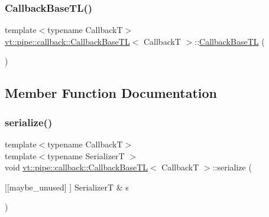 \subsubsection{\texorpdfstring{Callback\+Base\+T\+L()}{CallbackBaseTL()}}
{\footnotesize\ttfamily template$<$typename CallbackT$>$ \\
\hyperlink{structvt_1_1pipe_1_1callback_1_1_callback_base_t_l}{vt\+::pipe\+::callback\+::\+Callback\+Base\+TL}$<$ CallbackT $>$\+::\hyperlink{structvt_1_1pipe_1_1callback_1_1_callback_base_t_l}{Callback\+Base\+TL} (\begin{DoxyParamCaption}{ }\end{DoxyParamCaption})\hspace{0.3cm}{\ttfamily [default]}}



\subsection{Member Function Documentation}
\mbox{\label{structvt_1_1pipe_1_1callback_1_1_callback_base_t_l_a881775a6243c432e7536735d481a5d9a}} 
\subsubsection{\texorpdfstring{serialize()}{serialize()}}
{\footnotesize\ttfamily template$<$typename CallbackT$>$ \\
template$<$typename SerializerT $>$ \\
void \hyperlink{structvt_1_1pipe_1_1callback_1_1_callback_base_t_l}{vt\+::pipe\+::callback\+::\+Callback\+Base\+TL}$<$ CallbackT $>$\+::serialize (\begin{DoxyParamCaption}\item[{\mbox{[}\mbox{[}maybe\+\_\+unused\mbox{]} \mbox{]} SerializerT \&}]{s }\end{DoxyParamCaption})\hspace{0.3cm}{\ttfamily [inline]}}

\mbox{\label{structvt_1_1pipe_1_1callback_1_1_callback_base_t_l_ac9deeadfe2d31c1f18051f1238f6c1d7}} 
